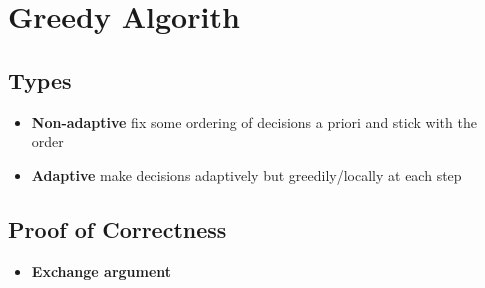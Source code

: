 \chapter{Greedy Algorith}

\section{Types}

  \begin{itemize}
    \item \textbf{Non-adaptive} fix some ordering of decisions a priori and
    stick with the order
    \item \textbf{Adaptive} make decisions adaptively but greedily/locally at
    each step
  \end{itemize}

\section{Proof of Correctness}

  \begin{itemize}
    \item \textbf{Exchange argument}
  \end{itemize}

